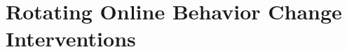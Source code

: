 \chapter{Rotating Online Behavior Change Interventions}
\label{ch:rotation}

























%

%

%
